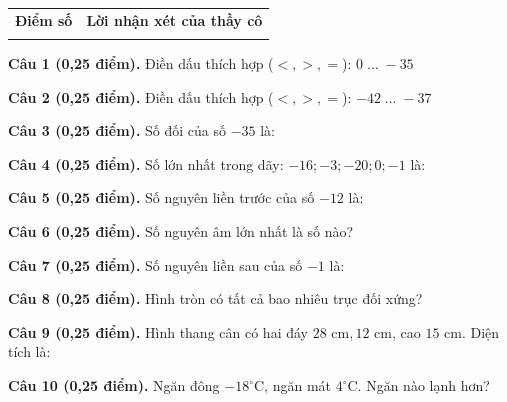 \documentclass[12pt,a4paper]{article}
\begin{document}
\vspace{1.0mm}

\noindent
\begin{tabularx}{\linewidth}{|p{3.2cm}|X|}
\hline
\centering\textbf{Điểm số} & \centering\textbf{Lời nhận xét của thầy cô} \tabularnewline
\rule{0pt}{1.8cm} & \\
\hline
\end{tabularx}

\vspace{1.0mm}

\noindent\textbf{Câu 1 (0,25 điểm).} Điền dấu thích hợp ($<, >, =$): $0 \; \dots \; -35$ \shortans{$>$}\par\vspace{0.25mm}
\noindent\textbf{Câu 2 (0,25 điểm).} Điền dấu thích hợp ($<, >, =$): $-42 \; \dots \; -37$ \shortans{$<$}\par\vspace{0.25mm}
\noindent\textbf{Câu 3 (0,25 điểm).} Số đối của số $-35$ là: \par\vspace{0.25mm}
\noindent\textbf{Câu 4 (0,25 điểm).} Số lớn nhất trong dãy: $-16; -3; -20; 0; -1$ là: \par\vspace{0.25mm}
\noindent\textbf{Câu 5 (0,25 điểm).} Số nguyên liền trước của số $-12$ là: \par\vspace{0.25mm}
\noindent\textbf{Câu 6 (0,25 điểm).} Số nguyên âm lớn nhất là số nào? \par\vspace{0.25mm}
\noindent\textbf{Câu 7 (0,25 điểm).} Số nguyên liền sau của số $-1$ là: \par\vspace{0.25mm}
\noindent\textbf{Câu 8 (0,25 điểm).} Hình tròn có tất cả bao nhiêu trục đối xứng? \par\vspace{0.25mm}
\noindent\textbf{Câu 9 (0,25 điểm).} Hình thang cân có hai đáy $28\text{ cm}, 12\text{ cm}$, cao $15\text{ cm}$. Diện tích là: \par\vspace{0.25mm}
\noindent\textbf{Câu 10 (0,25 điểm).} Ngăn đông $-18^\circ\text{C}$, ngăn mát $4^\circ\text{C}$. Ngăn nào lạnh hơn? \par\vspace{0.25mm}
\end{document}
